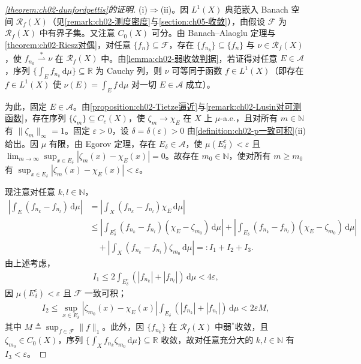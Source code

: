 \documentclass[../../main.tex]{subfiles}%
\begin{document}
\begin{proof}[\cref{theorem:ch02-dunfordpettis}的证明]
(i)$\Rightarrow$(ii)。因 $L^1(X)$ 典范嵌入 Banach 空间 $\mathscr R_f(X)$（见\cref{remark:ch02-测度密度}与\cref{section:ch05-收敛}），由假设 $\mathscr F$ 为 $\mathscr R_f(X)$ 中有界子集。又注意 $C_0(X)$ 可分。由 Banach--Alaoglu 定理与\cref{theorem:ch02-Riesz对偶}，对任意 $\{f_n\}\subseteq\mathscr F$，存在 $\{f_{n_k}\}\subseteq\{f_n\}$ 与 $\nu\in\mathscr R_f(X)$，使 $f_{n_k}\stackrel{*}{\rightharpoonup}\nu$ 在 $\mathscr R_f(X)$ 中。由\cref{lemma:ch02-弱收敛判据}，若证得对任意 $E\in\mathscr A$，序列 $\{\int_E f_{n_k}\,\mathrm{d}\mu\}\subseteq\mathbb R$ 为 Cauchy 列，则 $\nu$ 可等同于函数 $f\in L^1(X)$（即存在 $f\in L^1(X)$ 使 $\nu(E)=\int_E f\,\mathrm{d}\mu$ 对一切 $E\in\mathscr A$ 成立）。

为此，固定 $E\in\mathscr A$。由\cref{proposition:ch02-Tietze逼近}与\cref{remark:ch02-Lusin对可测函数}，存在序列 $\{\zeta_m\}\subseteq C_c(X)$，使 $\zeta_m\to\chi_E$ 在 $X$ 上 $\mu$-a.e.，且对所有 $m\in\mathbb N$ 有 $\|\zeta_m\|_\infty=1$。固定 $\varepsilon>0$，设 $\delta=\delta(\varepsilon)>0$ 由\cref{definition:ch02-p一致可积}(ii)给出。因 $\mu$ 有限，由 Egorov 定理，存在 $E_\delta\in\mathscr A$，使 $\mu(E_\delta^c)<\varepsilon$ 且 $\lim_{m\to\infty}\sup_{x\in E_\delta}|\zeta_m(x)-\chi_E(x)|=0$。故存在 $m_0\in\mathbb N$，使对所有 $m\geqslant m_0$ 有 $\sup_{x\in E_\delta}|\zeta_m(x)-\chi_E(x)|<\varepsilon$。

现注意对任意 $k,l\in\mathbb N$，
\begin{align*}
\left|\int_E(f_{n_k}-f_{n_l})\,\mathrm{d}\mu\right|
&=\left|\int_X(f_{n_k}-f_{n_l})\chi_E\,\mathrm{d}\mu\right|\\
&\leqslant\left|\int_{E_\delta^c}(f_{n_k}-f_{n_l})(\chi_E-\zeta_{m_0})\,\mathrm{d}\mu\right|
+\left|\int_{E_\delta}(f_{n_k}-f_{n_l})(\chi_E-\zeta_{m_0})\,\mathrm{d}\mu\right|\\
&\quad+\left|\int_X(f_{n_k}-f_{n_l})\zeta_{m_0}\,\mathrm{d}\mu\right|
=:I_1+I_2+I_3.
\end{align*}
由上述考虑，
\begin{align*}
I_1\leqslant 2\int_{E_\delta^c}(|f_{n_k}|+|f_{n_l}|)\,\mathrm{d}\mu<4\varepsilon,
\end{align*}
因 $\mu(E_\delta^c)<\varepsilon$ 且 $\mathscr F$ 一致可积；
\begin{align*}
I_2\leqslant\sup_{x\in E_\delta}|\zeta_{m_0}(x)-\chi_E(x)|\int_{E_\delta}(|f_{n_k}|+|f_{n_l}|)\,\mathrm{d}\mu<2\varepsilon M,
\end{align*}
其中 $M\triangleq \sup_{f\in\mathscr F}\|f\|_1$。此外，因 $\{f_{n_k}\}$ 在 $\mathscr R_f(X)$ 中弱$^*$收敛，且 $\zeta_{m_0}\in C_0(X)$，序列 $\{\int_X f_{n_k}\zeta_{m_0}\,\mathrm{d}\mu\}\subseteq\mathbb R$ 收敛，故对任意充分大的 $k,l\in\mathbb N$ 有 $I_3<\varepsilon$。


\end{proof}
\end{document}
